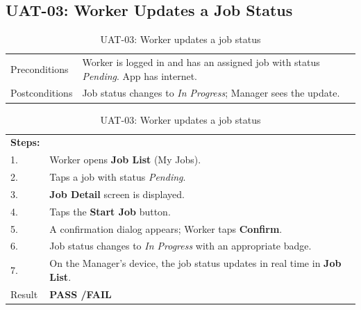 \subsection*{UAT-03: Worker Updates a Job Status}
\begin{table}[H]
  \centering
  \begin{tabularx}{\textwidth}{lX}
    \toprule
    Preconditions  & Worker is logged in and has an assigned job with status \textit{Pending}. App has internet. \\
    Postconditions & Job status changes to \textit{In Progress}; Manager sees the update. \\
    \midrule
  \end{tabularx}
  \begin{tabularx}{\textwidth}{lX}
    \textbf{Steps:} & \\
    1. & Worker opens \textbf{Job List} (My Jobs). \\
    2. & Taps a job with status \textit{Pending}. \\
    3. & \textbf{Job Detail} screen is displayed. \\
    4. & Taps the \textbf{Start Job} button. \\
    5. & A confirmation dialog appears; Worker taps \textbf{Confirm}. \\
    6. & Job status changes to \textit{In Progress} with an appropriate badge. \\
    7. & On the Manager's device, the job status updates in real time in \textbf{Job List}. \\
    \midrule
    Result & \textbf{PASS \quad/\quad FAIL} \\
    \bottomrule
  \end{tabularx}
  \caption{UAT-03: Worker updates a job status}
\end{table}

